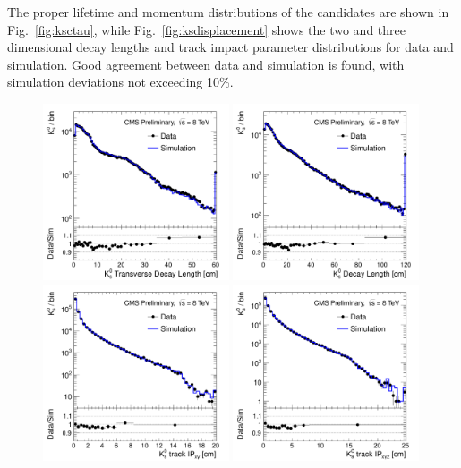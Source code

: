 The proper lifetime and momentum distributions of the \Kshort candidates are
shown in Fig.~\ref{fig:ksctau}, while
Fig.~\ref{fig:ksdisplacement} shows the two and three dimensional decay lengths and track impact
 parameter distributions for data and simulation.  
 Good agreement between data and simulation is found, with simulation
 deviations not exceeding 10\%.   

\begin{figure}[htbp]
\centering
\includegraphics[width=0.49\textwidth]{plots/kshort/kslxy.pdf}
\includegraphics[width=0.49\textwidth]{plots/kshort/kslxyz.pdf}\\
\includegraphics[width=0.49\textwidth]{plots/kshort/kstrkip2d.pdf}
\includegraphics[width=0.49\textwidth]{plots/kshort/kstrkip3d.pdf}\\

\end{figure}
